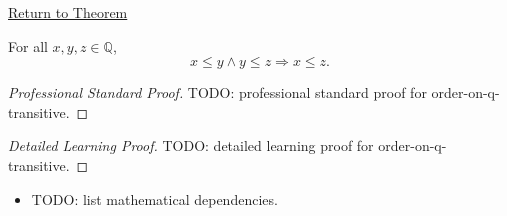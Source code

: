 \newpage
{}
\label{prf:order-on-q-transitive}

\begin{remark*}[Return]
\hyperref[thm:order-on-q-transitive]{Return to Theorem}
\end{remark*}

\begin{theorem*}
For all $x,y,z\in\mathbb{Q}$,
\[
x\le y\land y\le z \Longrightarrow x\le z.
\]
\end{theorem*}

\begin{proof}[Professional Standard Proof]
\LRAProofBodyStart
TODO: professional standard proof for order-on-q-transitive.
\end{proof}

\begin{proof}[Detailed Learning Proof]
\LRAProofBodyStart
TODO: detailed learning proof for order-on-q-transitive.
\end{proof}

\begin{remark*}
\end{remark*}

\begin{dependencies}
\begin{itemize}
  \item TODO: list mathematical dependencies.
\end{itemize}
\end{dependencies}

\clearpage
